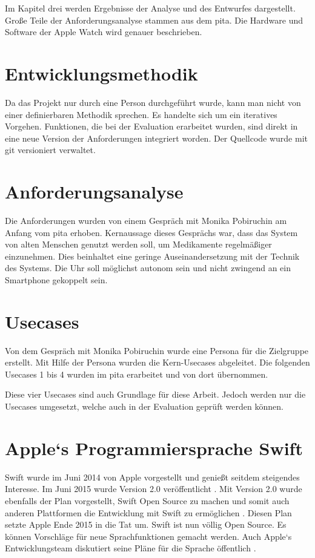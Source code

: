 Im Kapitel drei werden Ergebnisse der Analyse und des Entwurfes dargestellt. Große Teile der Anforderungsanalyse stammen aus dem \gls{pita}. Die Hardware und Software der Apple Watch wird genauer beschrieben.
\section{Entwicklungsmethodik}
Da das Projekt nur durch eine Person durchgeführt wurde, kann man nicht von einer definierbaren Methodik sprechen. Es handelte sich um ein iteratives Vorgehen. Funktionen, die bei der Evaluation erarbeitet wurden, sind direkt in eine neue Version der Anforderungen integriert worden. Der Quellcode wurde mit \gls{git} versioniert verwaltet.
\section{Anforderungsanalyse}
Die Anforderungen wurden von einem Gespräch mit Monika Pobiruchin am Anfang vom \gls{pita} erhoben. Kernaussage dieses Gesprächs war, dass das System von alten Menschen genutzt werden soll, um Medikamente regelmäßiger einzunehmen. Dies beinhaltet eine geringe Auseinandersetzung mit der Technik des Systems. Die Uhr soll möglichst autonom sein und nicht zwingend an ein Smartphone gekoppelt sein.

\section{Usecases} 
Von dem Gespräch mit Monika Pobiruchin wurde eine Persona für die Zielgruppe erstellt.
Mit Hilfe der Persona wurden die Kern-Usecases abgeleitet. Die folgenden Usecases 1 bis 4 wurden im \gls{pita} erarbeitet und von dort übernommen. 

Diese vier Usecases sind auch Grundlage für diese Arbeit. Jedoch werden nur die Usecases umgesetzt, welche auch in der Evaluation geprüft werden können.

\section{Apple`s Programmiersprache Swift}
Swift wurde im Juni 2014 von Apple vorgestellt und genießt seitdem steigendes Interesse. Im Juni 2015 wurde Version 2.0 veröffentlicht \cite{Apple:2014sp}. Mit Version 2.0 wurde ebenfalls der Plan vorgestellt, Swift Open Source zu machen und somit auch anderen Plattformen die Entwicklung mit Swift zu ermöglichen \cite{Apple:2014sp}. Diesen Plan setzte Apple Ende 2015 in die Tat um. Swift ist nun völlig Open Source. Es können Vorschläge für neue Sprachfunktionen gemacht werden. Auch Apple`s Entwicklungsteam diskutiert seine Pläne für die Sprache öffentlich \cite{Apple:2015swiftOpen}.

